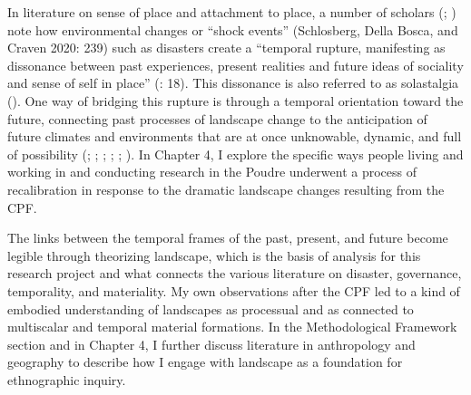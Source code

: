\documentclass[
]{article}
\begin{document}
In literature on sense of place and attachment to place, a number of scholars (; ) note how environmental changes or ``shock events'' (Schlosberg, Della Bosca, and Craven 2020: 239) such as disasters create a ``temporal rupture, manifesting as dissonance between past experiences, present realities and future ideas of sociality and sense of self in place'' (: 18). This dissonance is also referred to as solastalgia (). One way of bridging this rupture is through a temporal orientation toward the future, connecting past processes of landscape change to the anticipation of future climates and environments that are at once unknowable, dynamic, and full of possibility (; ; ; ; ; ). In Chapter 4, I explore the specific ways people living and working in and conducting research in the Poudre underwent a process of recalibration in response to the dramatic landscape changes resulting from the CPF.

The links between the temporal frames of the past, present, and future become legible through theorizing landscape, which is the basis of analysis for this research project and what connects the various literature on disaster, governance, temporality, and materiality. My own observations after the CPF led to a kind of embodied understanding of landscapes as processual and as connected to multiscalar and temporal material formations. In the Methodological Framework section and in Chapter 4, I further discuss literature in anthropology and geography to describe how I engage with landscape as a foundation for ethnographic inquiry.
\end{document}
